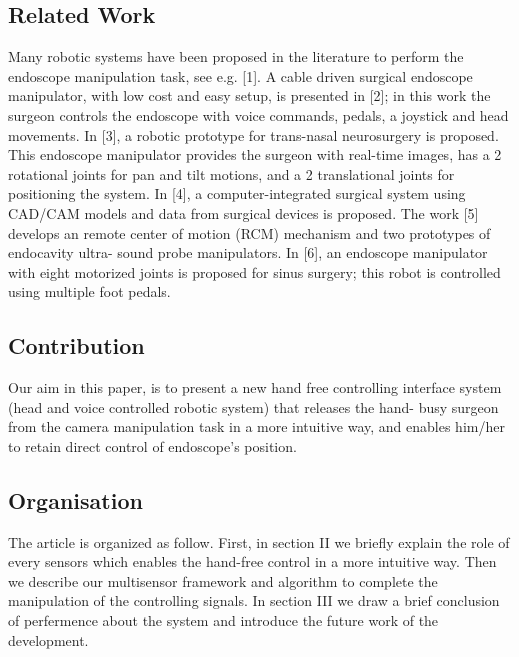 \documentclass[journal,twoside]{IEEEtran}
\theoremstyle{definition}
\begin{document}
\subsection{Related Work}
Many robotic systems have been proposed in the literature
to perform the endoscope manipulation task, see e.g. [1]. A
cable driven surgical endoscope manipulator, with low cost
and easy setup, is presented in [2]; in this work the surgeon
controls the endoscope with voice commands, pedals, a
joystick and head movements.
In [3], a robotic prototype for trans-nasal neurosurgery is
proposed. This endoscope manipulator provides the surgeon
with real-time images, has a 2 rotational joints for pan
and tilt motions, and a 2 translational joints for positioning
the system. In [4], a computer-integrated surgical system
using CAD/CAM models and data from surgical devices is
proposed. The work [5] develops an remote center of motion
(RCM) mechanism and two prototypes of endocavity ultra-
sound probe manipulators. In [6], an endoscope manipulator
with eight motorized joints is proposed for sinus surgery;
this robot is controlled using multiple foot pedals.


\subsection{Contribution}
Our aim in this paper, is to present
a new hand free controlling interface system (head and voice controlled robotic system) that releases the hand-
busy surgeon from the camera manipulation task in a more intuitive way, and enables
him/her to retain direct control of endoscope's position.

\subsection{Organisation} %
The article is organized as follow. First, in section II we briefly explain the role of every sensors which enables the hand-free
control in a more intuitive way. Then we describe our multisensor framework and algorithm to complete the manipulation
of the controlling signals. In section III we draw a brief conclusion of perfermence about the system and introduce the future work of the development.
\end{document}
